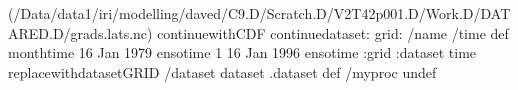 \begin{ingrid}
(/Data/data1/iri/modelling/daved/C9.D/Scratch.D/V2T42p001.D/Work.D/DATARED.D/grads.lats.nc) continuewithCDF
continuedataset: 
grid:
/name /time def
monthtime
16 Jan 1979 ensotime
1
16 Jan 1996 ensotime
:grid
:dataset
time replacewithdatasetGRID
/dataset dataset .dataset def
/myproc undef
\end{ingrid}
